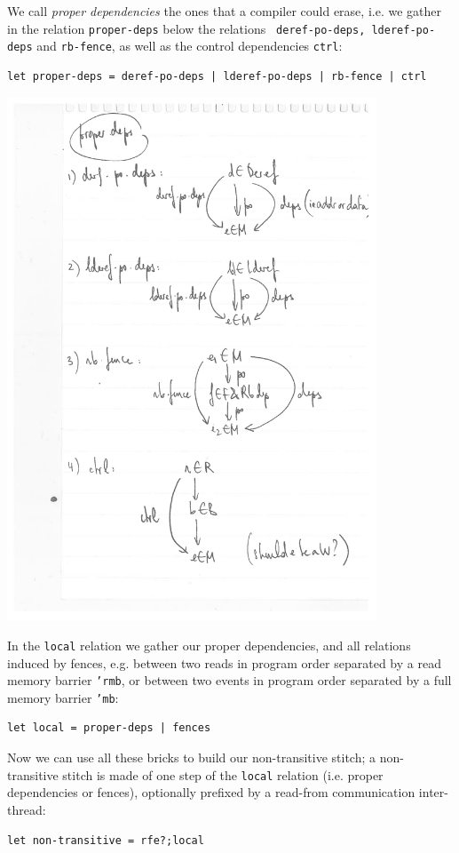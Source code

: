 \documentclass[a4paper]{article}
\begin{document}
\pagebreak

We call \emph{proper dependencies} the ones that a compiler could erase, i.e.
we gather in the relation {\tt proper-deps} below the relations {\tt
deref-po-deps, lderef-po-deps} and {\tt rb-fence}, as well as the control
dependencies {\tt ctrl}:
\begin{verbatim}
let proper-deps = deref-po-deps | lderef-po-deps | rb-fence | ctrl
\end{verbatim}

\includegraphics[width=11cm]{proper-deps}

\pagebreak

In the {\tt local} relation we gather our proper dependencies, and all
relations induced by fences, e.g. between two reads in program order separated
by a read memory barrier {\tt 'rmb}, or between two events in program order
separated by a full memory barrier {\tt 'mb}:
\begin{verbatim}
let local = proper-deps | fences
\end{verbatim}

Now we can use all these bricks to build our non-transitive stitch; a
non-transitive stitch is made of one step of the {\tt local} relation (i.e.
proper dependencies or fences), optionally prefixed by a read-from
communication inter-thread:
\begin{verbatim}
let non-transitive = rfe?;local
\end{verbatim}
\end{document}
